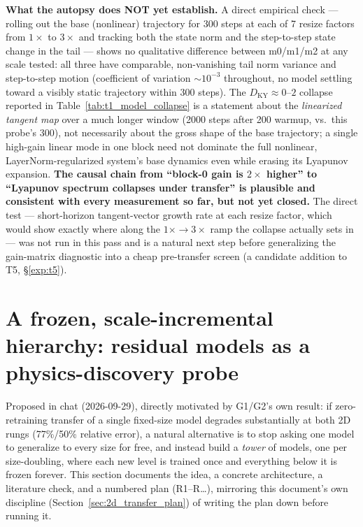 \documentclass[11pt]{article}
\begin{document}
\textbf{What the autopsy does NOT yet establish.} A direct empirical
check --- rolling out the base (nonlinear) trajectory for 300 steps at
each of 7 resize factors from $1\times$ to $3\times$ and tracking both
the state norm and the step-to-step state change in the tail --- shows no
qualitative difference between m0/m1/m2 at any scale tested: all three
have comparable, non-vanishing tail norm variance and step-to-step
motion (coefficient of variation $\sim10^{-3}$ throughout, no model
settling toward a visibly static trajectory within 300 steps). The
$D_{\mathrm{KY}}\approx0$--$2$ collapse reported in
Table~\ref{tab:t1_model_collapse} is a statement about the
\emph{linearized tangent map} over a much longer window (2000 steps after
200 warmup, vs.\ this probe's 300), not necessarily about the gross shape
of the base trajectory; a single high-gain linear mode in one block need
not dominate the full nonlinear, LayerNorm-regularized system's base
dynamics even while erasing its Lyapunov expansion. \textbf{The causal
chain from ``block-0 gain is $2\times$ higher'' to ``Lyapunov spectrum
collapses under transfer'' is plausible and consistent with every
measurement so far, but not yet closed.} The direct test --- short-horizon
tangent-vector growth rate at each resize factor, which would show
exactly where along the $1\times\to3\times$ ramp the collapse actually
sets in --- was not run in this pass and is a natural next step before
generalizing the gain-matrix diagnostic into a cheap pre-transfer screen
(a candidate addition to T5, \S\ref{exp:t5}).

\section{A frozen, scale-incremental hierarchy: residual models as a physics-discovery probe}
\label{sec:residual_hierarchy}

Proposed in chat (2026-09-29), directly motivated by G1/G2's own result:
if zero-retraining transfer of a single fixed-size model degrades
substantially at both 2D rungs (77\%/50\% relative error), a natural
alternative is to stop asking one model to generalize to every size for
free, and instead build a \emph{tower} of models, one per
size-doubling, where each new level is trained once and everything below
it is frozen forever. This section documents the idea, a concrete
architecture, a literature check, and a numbered plan (R1--R\ldots),
mirroring this document's own discipline (Section~\ref{sec:2d_transfer_plan})
of writing the plan down before running it.
\end{document}
